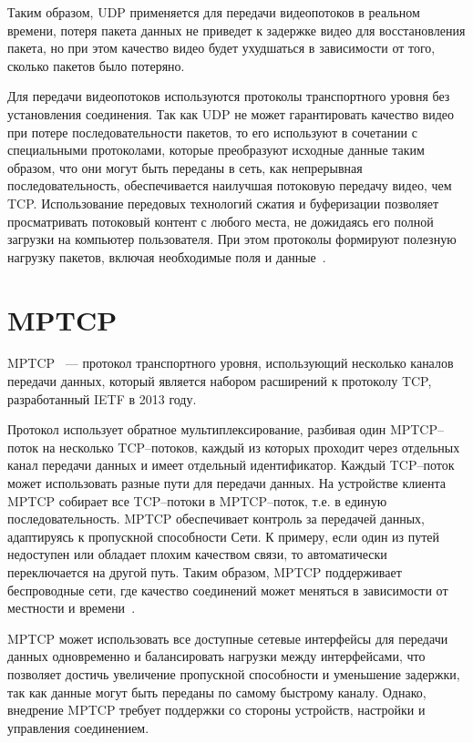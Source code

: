 Таким образом, UDP применяется для передачи видеопотоков в реальном времени, потеря пакета данных не приведет к задержке видео для восстановления пакета, но при этом качество видео будет ухудшаться в зависимости от того, сколько пакетов было потеряно.

Для передачи видеопотоков используются протоколы транспортного уровня без установления соединения. 
Так как UDP не может гарантировать качество видео при потере последовательности пакетов, то его используют в сочетании с специальными протоколами, которые преобразуют исходные данные таким образом, что они могут быть переданы в сеть, как непрерывная последовательность, обеспечивается наилучшая потоковую передачу видео, чем TCP. Использование передовых технологий сжатия и буферизации  позволяет просматривать потоковый контент с любого места, не дожидаясь его полной загрузки на компьютер пользователя. 
При этом протоколы формируют полезную нагрузку пакетов, включая необходимые поля и данные~\cite{basic_stream_protocls}. 

\section{MPTCP}

MPTCP~\cite{rfc-mptcp-6824} --- протокол транспортного уровня, использующий несколько каналов передачи данных, который является набором расширений к протоколу TCP, разработанный IETF в 2013 году.

Протокол использует обратное мультиплексирование, разбивая один \newline MPTCP--поток на несколько TCP--потоков, каждый из которых проходит через отдельных канал передачи данных и имеет отдельный идентификатор. Каждый TCP--поток может использовать разные пути для передачи данных. 
На устройстве клиента MPTCP собирает все TCP--потоки в MPTCP--поток, т.е. в единую последовательность.
MPTCP обеспечивает контроль за передачей данных, адаптируясь к пропускной способности Сети.
К примеру, если один из путей недоступен или обладает плохим качеством связи, то автоматически переключается на другой путь.
Таким образом, MPTCP поддерживает беспроводные сети, где качество соединений может меняться в зависимости от местности и времени~\cite{rfc-mptcp-6824, rfc-mptcp-8684}. 

MPTCP может использовать все доступные сетевые интерфейсы для передачи данных одновременно и балансировать нагрузки между интерфейсами, что позволяет достичь увеличение пропускной способности и уменьшение задержки, так как данные могут быть переданы по самому быстрому каналу.
Однако, внедрение MPTCP требует поддержки со стороны устройств, настройки и управления соединением.

